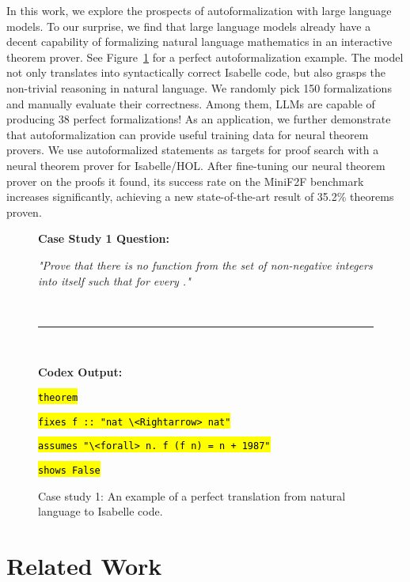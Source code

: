 \documentclass{article}
\begin{document}
In this work, we explore the prospects of autoformalization with large language models. To our surprise, we find that large language models already have a decent capability of formalizing natural language mathematics in an interactive theorem prover. See Figure~\ref{fig:example_1} for a perfect autoformalization example. The model not only translates into syntactically correct Isabelle code, but also grasps the non-trivial reasoning in natural language.
We randomly pick 150 formalizations and manually evaluate their correctness. Among them, LLMs are capable of producing 38 perfect formalizations! As an application, we further demonstrate that autoformalization can provide useful training data for neural theorem provers.
We use autoformalized statements as targets for proof search with a neural theorem prover for Isabelle/HOL.
After fine-tuning our neural theorem prover on the proofs it found, its success rate on the MiniF2F benchmark~\citep{zheng2021minif2f} increases significantly, achieving a new state-of-the-art result of 35.2\% theorems proven.
\begin{figure}[t]
\begin{center}
\begin{minipage}[c]{0.9\linewidth}
\begin{boxB}
\textbf{Case Study 1 Question:} 

\emph{"Prove that there is no function  from the set of non-negative integers into itself such that  for every ."}

\
\hrule
\

\textbf{Codex Output:} 

\hl{\texttt{theorem}}

  \hspace{12pt}\hl{\texttt{fixes f :: "nat \textbackslash<Rightarrow> nat"}}
  
  \hspace{12pt}\hl{\texttt{assumes "\textbackslash<forall> n. f (f n) = n + 1987"}}
  
  \hspace{12pt}\hl{\texttt{shows False}}
\end{boxB}
\end{minipage}
\end{center}
\label{fig:example_1}
\caption{Case study 1: An example of a perfect translation from natural language to Isabelle code.}
\vspace{-10pt}
\end{figure} \section{Related Work}
\end{document}
